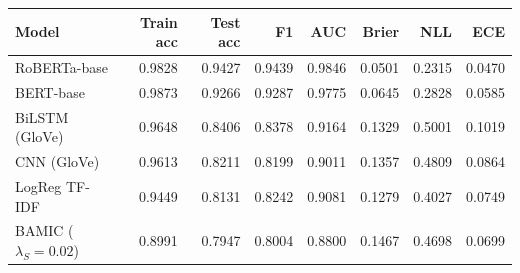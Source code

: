 \begin{tabular}{lrrrrrrr}
\toprule
Model & Train acc & Test acc & F1 & AUC & Brier & NLL & ECE \\
\midrule
RoBERTa-base & 0.9828 & 0.9427 & 0.9439 & 0.9846 & 0.0501 & 0.2315 & 0.0470 \\
BERT-base & 0.9873 & 0.9266 & 0.9287 & 0.9775 & 0.0645 & 0.2828 & 0.0585 \\
BiLSTM (GloVe) & 0.9648 & 0.8406 & 0.8378 & 0.9164 & 0.1329 & 0.5001 & 0.1019 \\
CNN (GloVe) & 0.9613 & 0.8211 & 0.8199 & 0.9011 & 0.1357 & 0.4809 & 0.0864 \\
LogReg TF-IDF & 0.9449 & 0.8131 & 0.8242 & 0.9081 & 0.1279 & 0.4027 & 0.0749 \\
BAMIC ($\lambda_S{=}0.02$) & 0.8991 & 0.7947 & 0.8004 & 0.8800 & 0.1467 & 0.4698 & 0.0699 \\
\bottomrule
\end{tabular}
